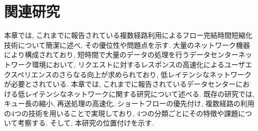 
\chapter{関連研究}
\label{chapter:related_work}
本章では, これまでに報告されている複数経路利用によるフロー完結時間短縮化技術について簡潔に述べ, その優位性や問題点を示す.
大量のネットワーク機器により構成されており, 短時間で大量のデータの処理を行うデータセンターネットワーク環境において,
リクエストに対するレスポンスの高速化によるユーザエクスペリエンスのさらなる向上が求められており, 低レイテンシなネットワークが必要とされている. 
本章では, これまでに報告されているデータセンターにおける低レイテンシなネットワークに関する研究について述べる. 
既存の研究では, キュー長の縮小, 再送処理の高速化, ショートフローの優先付け, 複数経路の利用の4つの技術を用いることで実現しており,
4つの分類ごとにその特徴や課題について考察する. 
そして, 本研究の位置付けを示す. 



